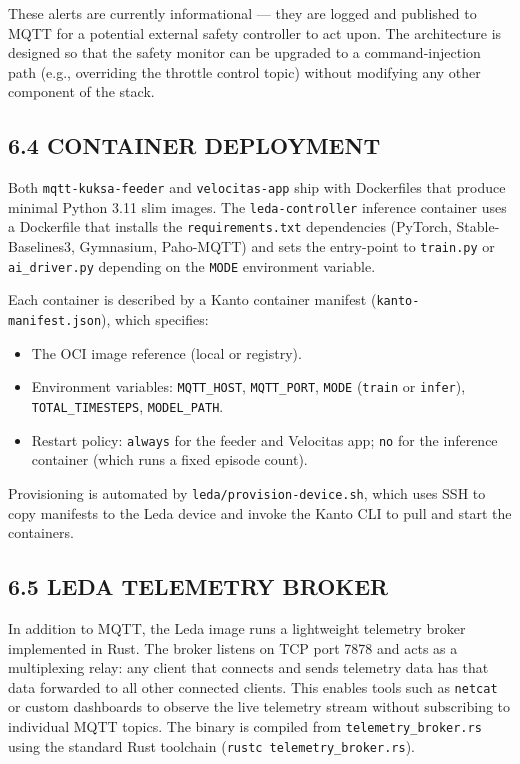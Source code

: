 \documentclass[12pt,a4paper]{article}
\begin{document}
These alerts are currently informational --- they are logged and published to
MQTT for a potential external safety controller to act upon. The architecture
is designed so that the safety monitor can be upgraded to a command-injection
path (e.g., overriding the throttle control topic) without modifying any other
component of the stack.

\subsection*{6.4 \quad CONTAINER DEPLOYMENT}

\indent Both \texttt{mqtt-kuksa-feeder} and \texttt{velocitas-app} ship with
Dockerfiles that produce minimal Python 3.11 slim images. The
\texttt{leda-controller} inference container uses a Dockerfile that installs
the \texttt{requirements.txt} dependencies (PyTorch, Stable-Baselines3,
Gymnasium, Paho-MQTT) and sets the entry-point to \texttt{train.py} or
\texttt{ai\_driver.py} depending on the \texttt{MODE} environment variable.

Each container is described by a Kanto container manifest
(\texttt{kanto-manifest.json}), which specifies:
\begin{itemize}
  \item The OCI image reference (local or registry).
  \item Environment variables: \texttt{MQTT\_HOST}, \texttt{MQTT\_PORT},
    \texttt{MODE} (\texttt{train} or \texttt{infer}), \texttt{TOTAL\_TIMESTEPS},
    \texttt{MODEL\_PATH}.
  \item Restart policy: \texttt{always} for the feeder and Velocitas app;
    \texttt{no} for the inference container (which runs a fixed episode count).
\end{itemize}

Provisioning is automated by \texttt{leda/provision-device.sh}, which uses SSH
to copy manifests to the Leda device and invoke the Kanto CLI to pull and
start the containers.

\subsection*{6.5 \quad LEDA TELEMETRY BROKER}

\indent In addition to MQTT, the Leda image runs a lightweight telemetry broker
implemented in Rust. The broker listens on TCP port 7878 and acts as a
multiplexing relay: any client that connects and sends telemetry data has that
data forwarded to all other connected clients. This enables tools such as
\texttt{netcat} or custom dashboards to observe the live telemetry stream
without subscribing to individual MQTT topics. The binary is compiled from
\texttt{telemetry\_broker.rs} using the standard Rust toolchain (\texttt{rustc
telemetry\_broker.rs}).
\end{document}
